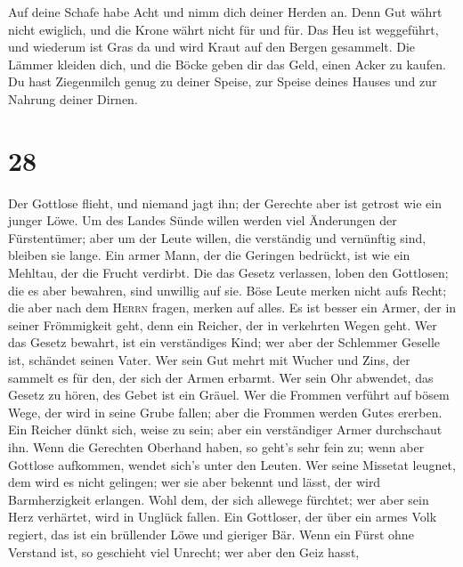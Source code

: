  Auf deine Schafe habe Acht und nimm dich deiner Herden
an.  Denn Gut währt nicht ewiglich, und die Krone währt
nicht für und für.  Das Heu ist weggeführt, und wiederum
ist Gras da und wird Kraut auf den Bergen gesammelt.  Die
Lämmer kleiden dich, und die Böcke geben dir das Geld, einen Acker zu
kaufen.  Du hast Ziegenmilch genug zu deiner Speise, zur
Speise deines Hauses und zur Nahrung deiner Dirnen.

\hypertarget{section-27}{%
\section{28}\label{section-27}}

 Der Gottlose flieht, und niemand jagt ihn; der Gerechte
aber ist getrost wie ein junger Löwe.  Um des Landes Sünde
willen werden viel Änderungen der Fürstentümer; aber um der Leute
willen, die verständig und vernünftig sind, bleiben sie lange.
 Ein armer Mann, der die Geringen bedrückt, ist wie ein
Mehltau, der die Frucht verdirbt.  Die das Gesetz
verlassen, loben den Gottlosen; die es aber bewahren, sind unwillig auf
sie.  Böse Leute merken nicht aufs Recht; die aber nach
dem \textsc{Herrn} fragen, merken auf alles.  Es ist
besser ein Armer, der in seiner Frömmigkeit geht, denn ein Reicher, der
in verkehrten Wegen geht.  Wer das Gesetz bewahrt, ist ein
verständiges Kind; wer aber der Schlemmer Geselle ist, schändet seinen
Vater.  Wer sein Gut mehrt mit Wucher und Zins, der
sammelt es für den, der sich der Armen erbarmt.  Wer sein
Ohr abwendet, das Gesetz zu hören, des Gebet ist ein Gräuel.
 Wer die Frommen verführt auf bösem Wege, der wird in
seine Grube fallen; aber die Frommen werden Gutes ererben.
 Ein Reicher dünkt sich, weise zu sein; aber ein
verständiger Armer durchschaut ihn.  Wenn die Gerechten
Oberhand haben, so geht's sehr fein zu; wenn aber Gottlose aufkommen,
wendet sich's unter den Leuten.  Wer seine Missetat
leugnet, dem wird es nicht gelingen; wer sie aber bekennt und lässt, der
wird Barmherzigkeit erlangen.  Wohl dem, der sich
allewege fürchtet; wer aber sein Herz verhärtet, wird in Unglück fallen.
 Ein Gottloser, der über ein armes Volk regiert, das ist
ein brüllender Löwe und gieriger Bär.  Wenn ein Fürst
ohne Verstand ist, so geschieht viel Unrecht; wer aber den Geiz hasst,
